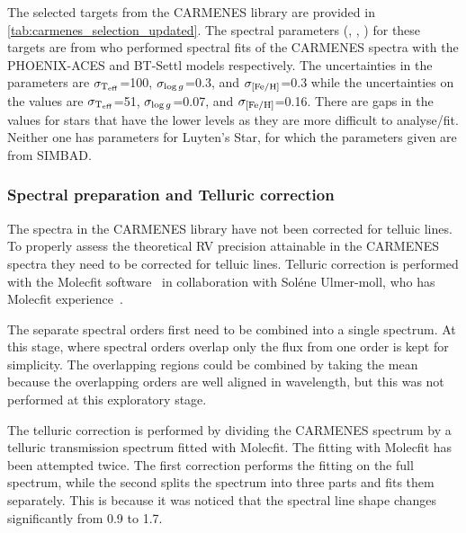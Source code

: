 The selected targets from the {CARMENES} library are provided in \cref{tab:carmenes_selection_updated}.
The spectral parameters (\Teff{}, \Logg{}, \feh{}) for these targets are from \citet{passegger_carmenes_2018, rajpurohit_exploring_2018} who performed spectral fits of the {CARMENES} spectra with the {PHOENIX-ACES} and {BT-Settl} models respectively.
The uncertainties in the \citet{rajpurohit_exploring_2018} parameters are \(\sigma_{\textrm{T}_{\mathrm{eff}}{}}\)=100\K{}, \(\sigma_{\log{g}{}}\)=0.3, and \(\sigma_{\feh{}}\)=0.3 while the uncertainties on the 
\citet{passegger_carmenes_2018} values are \(\sigma_{\textrm{T}_{\mathrm{eff}}{}}\)=51\K{}, \(\sigma_{\log{g}{}}\)=0.07, and \(\sigma_{\feh{}}\)=0.16.
There are gaps in the \citet{passegger_carmenes_2018} values for stars that have the lower \snr{} levels as they are more difficult to analyse/fit.
Neither one has parameters for Luyten's Star, for which the parameters given are from {SIMBAD}.

\begin{landscape}
    
\end{landscape}


\subsubsection{Spectral preparation and Telluric correction}
\label{subsec:prepatation_on_carmenes}
The spectra in the  {CARMENES} library have not been corrected for telluic lines.
To properly assess the theoretical {RV} precision attainable in the {CARMENES} spectra they need to be corrected for telluic lines.
Telluric correction is performed with the {Molecfit} software~\citep{smette_molecfit_2015} in collaboration with Sol\'ene Ulmer-moll, who has {Molecfit} experience~\citet{ulmer-moll_telluric_2018}.

The separate spectral orders first need to be combined into a single spectrum.
At this stage, where spectral orders overlap only the flux from one order is kept for simplicity.
The overlapping regions could be combined by taking the mean because the overlapping orders are well aligned in wavelength, but this was not performed at this exploratory stage.

The telluric correction is performed by dividing the {CARMENES} spectrum by a telluric transmission spectrum fitted with {Molecfit}.
The fitting with {Molecfit} has been attempted twice.
The first correction performs the fitting on the full \nir{} spectrum, while the second splits the spectrum into three parts and fits them separately.
This is because it was noticed that the spectral line shape changes significantly from 0.9\um{} to 1.7\um{}.

